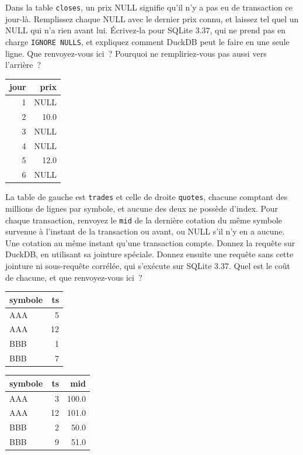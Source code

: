 \begin{question}\label{iq:iv3:sql-and-data:20}
Dans la table \texttt{closes}, un prix NULL signifie qu'il n'y a pas eu de transaction ce jour-là. Remplissez chaque NULL avec le dernier prix connu, et laissez tel quel un NULL qui n'a rien avant lui. Écrivez-la pour SQLite 3.37, qui ne prend pas en charge \texttt{IGNORE NULLS}, et expliquez comment DuckDB peut le faire en une seule ligne. Que renvoyez-vous ici~? Pourquoi ne rempliriez-vous pas aussi vers l'arrière~?
\begin{center}\small
\begin{tabular}{rr}
jour & prix\\\hline
1 & NULL\\
2 & 10.0\\
3 & NULL\\
4 & NULL\\
5 & 12.0\\
6 & NULL
\end{tabular}
\end{center}
\end{question}

\begin{question}\label{iq:iv3:sql-and-data:21}
La table de gauche est \texttt{trades} et celle de droite \texttt{quotes}, chacune comptant des millions de lignes par symbole, et aucune des deux ne possède d'index. Pour chaque transaction, renvoyez le \texttt{mid} de la dernière cotation du même symbole survenue à l'instant de la transaction ou avant, ou NULL s'il n'y en a aucune. Une cotation au même instant qu'une transaction compte. Donnez la requête sur DuckDB, en utilisant sa jointure spéciale. Donnez ensuite une requête sans cette jointure ni sous-requête corrélée, qui s'exécute sur SQLite 3.37. Quel est le coût de chacune, et que renvoyez-vous ici~?
\begin{center}\small
\begin{tabular}{lr}
symbole & ts\\\hline
AAA & 5\\
AAA & 12\\
BBB & 1\\
BBB & 7
\end{tabular}\qquad
\begin{tabular}{lrr}
symbole & ts & mid\\\hline
AAA & 3 & 100.0\\
AAA & 12 & 101.0\\
BBB & 2 & 50.0\\
BBB & 9 & 51.0
\end{tabular}
\end{center}
\end{question}

